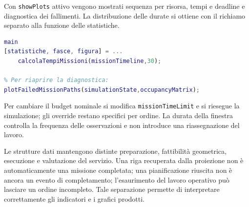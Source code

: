 Con \texttt{showPlots} attivo vengono mostrati sequenza per risorsa,
tempi e deadline e diagnostica dei fallimenti. La distribuzione delle
durate si ottiene con il richiamo separato alla funzione delle statistiche.

\begin{lstlisting}[language=Matlab,caption={Sequenza di utilizzo dopo la configurazione.},label={lst:impl-utilizzo}]
main
[statistiche, fasce, figura] = ...
    calcolaTempiMissioni(missionTimeline,30);

% Per riaprire la diagnostica:
plotFailedMissionPaths(simulationState,occupancyMatrix);
\end{lstlisting}

Per cambiare il budget nominale si modifica \texttt{missionTimeLimit}
e si riesegue la simulazione; gli override restano specifici per ordine.
La durata della finestra controlla la frequenza delle osservazioni e non
introduce una riassegnazione del lavoro.

Le strutture dati mantengono distinte preparazione, fattibilità geometrica,
esecuzione e valutazione del servizio. Una riga recuperata dalla proiezione
non è automaticamente una missione completata; una pianificazione riuscita
non è ancora un evento di completamento; l'esaurimento del lavoro operativo
può lasciare un ordine incompleto. Tale separazione permette di interpretare
correttamente gli indicatori e i grafici prodotti.